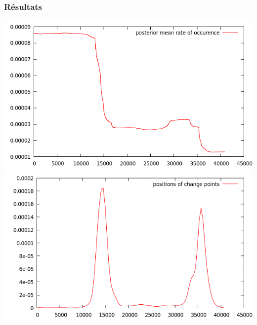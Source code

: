 \documentclass{beamer}
\begin{document}
\begin{frame}
\frametitle{Résultats}
\includegraphics[width = 0.5\linewidth]{posterior_mean_rate}\\
\includegraphics[width = 0.5\linewidth]{positions_change_points}
\end{frame}
\end{document}
